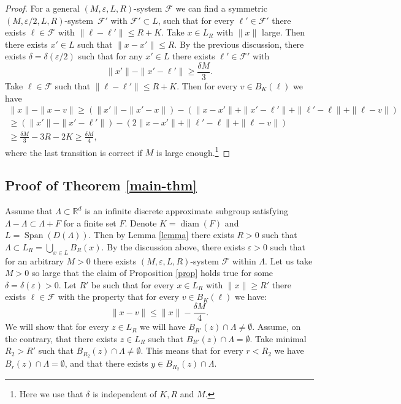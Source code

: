 \documentclass[JEP,XML,SOM,Unicode,NoEqCountersInSection]{cedram}
\DeclareMathOperator{\diam}{diam}
\DeclareMathOperator{\Span}{Span}
\newcommand{\cF}{\mathcal{F}}
\newcommand{\bR}{\mathbb{R}}
\let\eps\varepsilon
\theoremstyle{plain}
\theoremstyle{definition}
\begin{document}
\begin{proof}
For a general $(M,\eps,L,R)$-system $\cF$ we can find a symmetric $(M,\eps/2,L,R)$-sys\-tem~$\cF'$ with $\cF' \subset L$, such that for every $\ell' \in \cF'$ there exists $\ell \in \cF$ with $\| \ell - \ell' \| \le R+K$. Take $x \in L_R$ with $\| x \|$ large. Then there exists $x' \in L$ such that $\|x - x'\| \le R$. By the previous discussion, there exists $\delta = \delta(\eps/2)$ such that for any $x' \in L$ there exists $\ell' \in \cF'$ with
\[
\| x' \| - \| x' - \ell'\| \ge \frac{\delta M}{3}.
\]
Take $\ell \in \cF$ such that $\|\ell - \ell' \| \le R+K$. Then for every $v \in B_K(\ell)$ we have
\begin{multline*}
\|x\| - \| x - v\| \ge (\|x' \| - \| x' - x \|) - \left( \| x - x' \| + \| x' - \ell'\| + \| \ell' - \ell \| + \| \ell - v \| \right)\\
\ge \left( \| x' \| - \| x' - \ell' \| \right) - (2 \| x - x' \| + \| \ell' - \ell \| + \| \ell - v \|)\\
\ge \frac{\delta M}{3} - 3R - 2K \ge \frac{\delta M}{4},
\end{multline*}
where the last transition is correct if $M$ is large enough.\footnote{Here we use that $\delta$ is independent of $K,R$ and $M$.}
\end{proof}

\subsection{Proof of Theorem \ref{main-thm}}
Assume that $\Lambda \subset \bR^d$ is an infinite discrete approximate subgroup satisfying $\Lambda - \Lambda \subset \Lambda + F$ for a finite set $F$. Denote $K =\diam(F)$ and $L = \Span(D(\Lambda))$. Then by Lemma \ref{lemma} there exists $R > 0$ such that $\Lambda \subset L_R = \bigcup_{x \in L} B_R(x)$. By the discussion above, there exists $\eps> 0$ such that for an arbitrary $M > 0$ there exists $(M,\eps,L,R)$-system $\cF$ within $\Lambda$.
Let us take $M > 0$ so large that the claim of Proposition \ref{prop} holds true for some $\delta = \delta(\eps) > 0$. Let $R'$ be such that
for every $x \in L_R$ with $\| x \| \ge R'$ there exists $\ell \in \cF$ with the property that for every $v \in B_{K}(\ell)$ we have:
\[
\|x - v\| \le \| x \| - \frac{\delta M}{4}.
\]
We will show that for every $z \in L_R$ we will have $B_{R'}(z) \cap \Lambda \neq \emptyset$. Assume, on the contrary, that there exists $z \in L_R$ such that $B_{R'}(z) \cap \Lambda = \emptyset$. Take minimal $R_2 > R'$ such that $B_{R_2}(z) \cap \Lambda \neq \emptyset$. This means that for every $r < R_2$ we have $B_{r}(z) \cap \Lambda = \emptyset$, and that there exists $y \in B_{R_2}(z) \cap \Lambda$.
\end{document}
